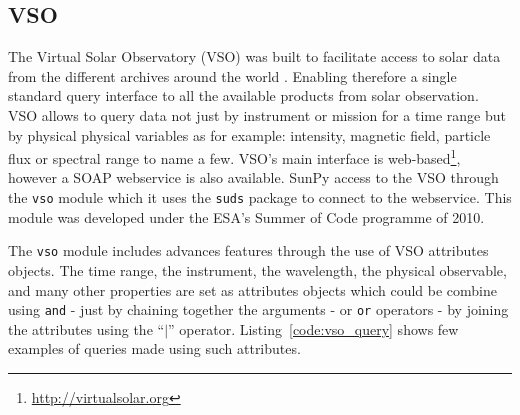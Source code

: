 \subsection{VSO}\label{ssec:vso}

The Virtual Solar Observatory (VSO) was built to facilitate
access to solar data from the different archives around the 
world \cite{hill_virtual_2009}.  
Enabling therefore a single standard query interface to all
the available products from solar observation.  
VSO allows to query data not just by instrument or mission for 
a time range but by physical physical variables as for example:
intensity, magnetic field, particle flux or spectral range to name a few.
VSO's main interface is web-based\footnote{\url{http://virtualsolar.org}}, 
however a SOAP webservice is also available.
SunPy access to the VSO through the \texttt{vso} module which it uses 
the \texttt{suds} package to connect to the webservice.
This module was developed under the ESA's Summer of Code programme of 2010.

The \texttt{vso} module includes advances features through the use
of VSO attributes objects.  
The time range, the instrument, the wavelength, the physical observable,
and many other properties are set as attributes objects which could
be combine using \texttt{and} - just by chaining together the arguments -
or \texttt{or} operators - by joining the attributes using the ``$|$'' operator.
Listing~\ref{code:vso_query} shows few examples of queries made using
such attributes.

